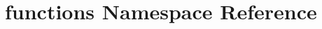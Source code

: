 \hypertarget{namespacefunctions}{\section{functions Namespace Reference}
\label{namespacefunctions}
}
